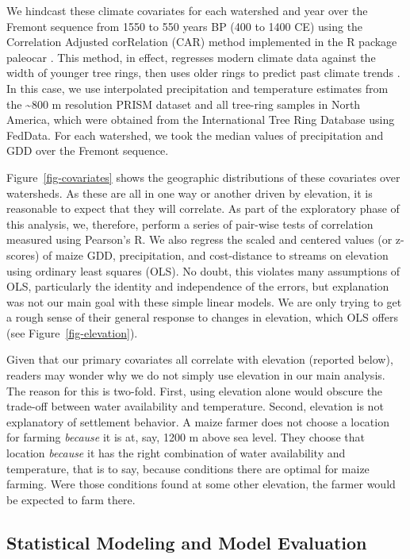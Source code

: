 \documentclass[
  number,
  preprint,
  3p]{elsarticle}
\begin{document}
We hindcast these climate covariates for each watershed and year over
the Fremont sequence from 1550 to 550 years BP (400 to 1400 CE) using
the Correlation Adjusted corRelation (CAR) method implemented in the R
package paleocar \citep{bocinsky2019}. This method, in effect, regresses
modern climate data against the width of younger tree rings, then uses
older rings to predict past climate trends \citep[for further details,
see][]{bocinsky2014, bocinsky2016}. In this case, we use interpolated
precipitation and temperature estimates from the \textasciitilde800 m
resolution PRISM dataset \citep{prismclimategroup2014} and all tree-ring
samples in North America, which were obtained from the International
Tree Ring Database using FedData. For each watershed, we took the median
values of precipitation and GDD over the Fremont sequence.

Figure~\ref{fig-covariates} shows the geographic distributions of these
covariates over watersheds. As these are all in one way or another
driven by elevation, it is reasonable to expect that they will
correlate. As part of the exploratory phase of this analysis, we,
therefore, perform a series of pair-wise tests of correlation measured
using Pearson's R. We also regress the scaled and centered values (or
z-scores) of maize GDD, precipitation, and cost-distance to streams on
elevation using ordinary least squares (OLS). No doubt, this violates
many assumptions of OLS, particularly the identity and independence of
the errors, but explanation was not our main goal with these simple
linear models. We are only trying to get a rough sense of their general
response to changes in elevation, which OLS offers (see
Figure~\ref{fig-elevation}).

Given that our primary covariates all correlate with elevation (reported
below), readers may wonder why we do not simply use elevation in our
main analysis. The reason for this is two-fold. First, using elevation
alone would obscure the trade-off between water availability and
temperature. Second, elevation is not explanatory of settlement
behavior. A maize farmer does not choose a location for farming
\emph{because} it is at, say, 1200 m above sea level. They choose that
location \emph{because} it has the right combination of water
availability and temperature, that is to say, because conditions there
are optimal for maize farming. Were those conditions found at some other
elevation, the farmer would be expected to farm there.

\hypertarget{statistical-modeling-and-model-evaluation}{%
\subsection{Statistical Modeling and Model
Evaluation}\label{statistical-modeling-and-model-evaluation}}
\end{document}

